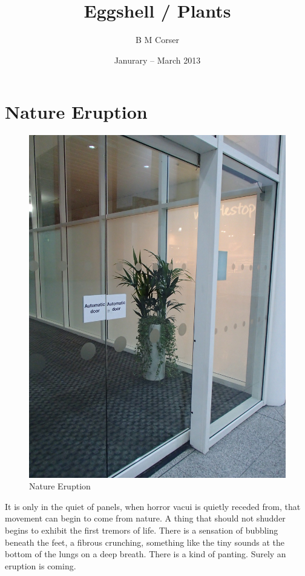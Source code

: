 \documentclass{book}
\title{Eggshell / Plants}
\author{B M Corser}
\date{Janurary -- March 2013}
\begin{document}
\maketitle

\tableofcontents

\chapter{Nature Eruption}

\begin{figure}
\centering
\includegraphics[width=\textwidth,angle=90]{figures/P1050140.JPG}
\caption{Nature Eruption}
\end{figure}

It is only in the quiet of panels, when horror vacui is quietly receded from,
that movement can begin to come from nature. A thing that should not shudder
begins to exhibit the first tremors of life. There is a sensation of bubbling
beneath the feet, a fibrous crunching, something like the tiny sounds at the
bottom of the lungs on a deep breath. There is a kind of panting. Surely an
eruption is coming.
\end{document}
